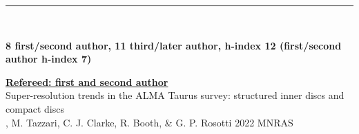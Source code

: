 \documentclass[10pt,preprint]{aastex}
\newcommand*{\xdash}[1][3em]{\rule[0.5ex]{#1}{0.7pt}}
\begin{document}


 \xdash[89.5ex] \\
\centerline{{\bf 8 first/second author, 11 third/later author, h-index 12 (first/second author h-index 7)}}

\noindent \underline{{\bf Refereed: first and second author}} \\
\noindent Super-resolution trends in the ALMA Taurus survey: structured inner discs and compact discs \\
, M. Tazzari, C. J. Clarke, R. Booth, \& G. P. Rosotti 2022 MNRAS 
\end{document}
